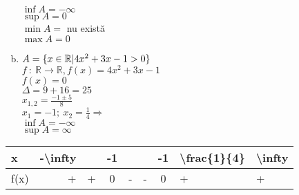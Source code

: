 \documentclass[a4paper, 12pt, notitlepage]{book}
\begin{document}
\begin{enumerate}[a.]
            $\inf A = -\infty$\\
            $\sup A = 0$\\
            $\min A =$ nu exist\u{a}\\
            $\max A = 0$

      \item $A = \{x \in \mathbb{R} \arrowvert 4x^{2} +3x-1 > 0\}$\\
            $f\ :\ \mathbb{R} \to \mathbb{R}, f(x) = 4x^{2} +3x-1$\\
            $f(x) = 0$\\
            $\Delta = 9+16 = 25$\\
            $x_{1,2} = \frac{-1 \pm 5}{8}$\\
            $x_{1} = -1;\ x_{2} = \frac{1}{4} \Rightarrow $\\

            $\inf A = -\infty$\\
            $\sup A = \infty$\\

    \end{enumerate}

\begin{table}[]
\begin{tabular}{l|llllllll}
x &
  -\textbackslash{}infty &
   &
  -1 &
   &
   &
  -1 &
  \textbackslash{}frac\{1\}\{4\} &
  \multicolumn{1}{r}{\textbackslash{}infty} \\ \hline
f(x) &
  \multicolumn{1}{r}{+} &
  \multicolumn{1}{r}{+} &
  \multicolumn{1}{c}{0} &
  \multicolumn{1}{c}{-} &
  \multicolumn{1}{c}{-} &
  \multicolumn{1}{c}{0} &
  + &
  +
\end{tabular}
\end{table}
\end{document}
